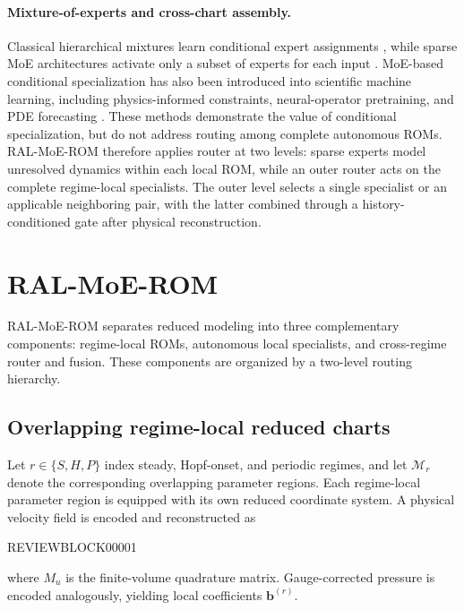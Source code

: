 \documentclass{article}
\begin{document}
\paragraph{Mixture-of-experts and cross-chart assembly.}
Classical hierarchical mixtures learn conditional expert assignments \citep{jacobs1991,jordan1994}, while sparse MoE architectures activate only a subset of experts for each input \citep{shazeer2017,fedus2022}. MoE-based conditional specialization has also been introduced into scientific machine learning, including physics-informed constraints, 
neural-operator pretraining, and PDE forecasting
\citep{ICLR2024_9aeda582,NEURIPS2024_b83fae17,
NEURIPS2025_2d23a999,ICLR2026_754612bd}. These methods demonstrate the value of conditional specialization, but do
not address routing among complete autonomous ROMs. RAL-MoE-ROM therefore applies router  at two levels: sparse experts model unresolved dynamics within each local ROM, while an outer router acts on the complete regime-local specialists. The outer level selects a single specialist or an
applicable neighboring pair, with the latter combined through a history-conditioned gate after physical reconstruction.



\section{RAL-MoE-ROM}
\label{sec:method}

RAL-MoE-ROM separates reduced modeling into three complementary components: regime-local ROMs, autonomous local specialists, and cross-regime router and fusion. These components are organized by a two-level routing hierarchy. 

\subsection{Overlapping regime-local reduced charts}

Let $r\in\{S,H,P\}$ index steady, Hopf-onset, and periodic regimes, and let $\mathcal M_r$ denote the corresponding overlapping parameter regions. Each regime-local parameter region is equipped with its own reduced coordinate system. A physical velocity field is encoded and reconstructed as


REVIEWBLOCK00001


where $M_u$ is the finite-volume quadrature matrix. Gauge-corrected pressure is encoded analogously, yielding local coefficients
$\bm b^{(r)}$. 
\end{document}
